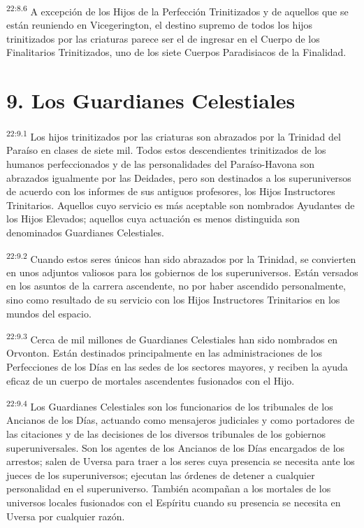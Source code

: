 \par
\textsuperscript{22:8.6} A excepción de los Hijos de la Perfección Trinitizados y de aquellos que se están reuniendo en Vicegerington, el destino supremo de todos los hijos trinitizados por las criaturas parece ser el de ingresar en el Cuerpo de los Finalitarios Trinitizados, uno de los siete Cuerpos Paradisiacos de la Finalidad.

\section*{9. Los Guardianes Celestiales}
\par
\textsuperscript{22:9.1} Los hijos trinitizados por las criaturas son abrazados por la Trinidad del Paraíso en clases de siete mil. Todos estos descendientes trinitizados de los humanos perfeccionados y de las personalidades del Paraíso-Havona son abrazados igualmente por las Deidades, pero son destinados a los superuniversos de acuerdo con los informes de sus antiguos profesores, los Hijos Instructores Trinitarios. Aquellos cuyo servicio es más aceptable son nombrados Ayudantes de los Hijos Elevados; aquellos cuya actuación es menos distinguida son denominados Guardianes Celestiales.

\par
\textsuperscript{22:9.2} Cuando estos seres únicos han sido abrazados por la Trinidad, se convierten en unos adjuntos valiosos para los gobiernos de los superuniversos. Están versados en los asuntos de la carrera ascendente, no por haber ascendido personalmente, sino como resultado de su servicio con los Hijos Instructores Trinitarios en los mundos del espacio.

\par
\textsuperscript{22:9.3} Cerca de mil millones de Guardianes Celestiales han sido nombrados en Orvonton. Están destinados principalmente en las administraciones de los Perfecciones de los Días en las sedes de los sectores mayores, y reciben la ayuda eficaz de un cuerpo de mortales ascendentes fusionados con el Hijo.

\par
\textsuperscript{22:9.4} Los Guardianes Celestiales son los funcionarios de los tribunales de los Ancianos de los Días, actuando como mensajeros judiciales y como portadores de las citaciones y de las decisiones de los diversos tribunales de los gobiernos superuniversales. Son los agentes de los Ancianos de los Días encargados de los arrestos; salen de Uversa para traer a los seres cuya presencia se necesita ante los jueces de los superuniversos; ejecutan las órdenes de detener a cualquier personalidad en el superuniverso. También acompañan a los mortales de los universos locales fusionados con el Espíritu cuando su presencia se necesita en Uversa por cualquier razón.

